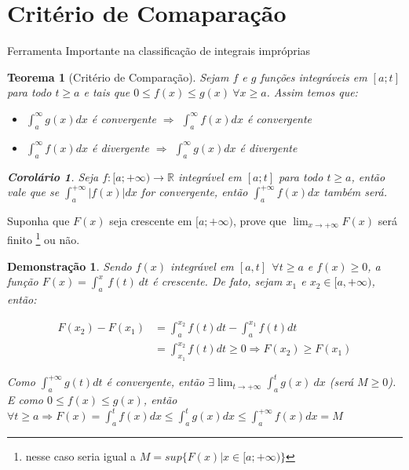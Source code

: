 \documentclass[12pt,openany]{book}
\newtheorem{theorem}{Teorema}[section]
\newtheorem{corollary}{Corolário}[theorem]
\newtheorem{demonstration}{Demonstração}
\begin{document}
\section{Critério de Comaparação}
\label{sec:13}

\hspace{5mm} Ferramenta Importante na classificação de integrais impróprias

\begin{theorem}[Critério de Comparação]
Sejam $f$ e $g$ funções integráveis em $[a;t]$ para todo $t\geq a$ e tais que $0\leq f(x)\leq g(x)\ \forall x \geq a$.  Assim temos que:
\begin{itemize}
\item $\displaystyle{\int_a^{\infty} g(x)dx}$ é convergente $\Rightarrow$ $\displaystyle{\int_a^{\infty} f(x)dx}$ é convergente
\item $\displaystyle{\int_a^{\infty} f(x)dx}$ é divergente $\Rightarrow$ $\displaystyle{\int_a^{\infty} g(x)dx}$ é divergente
\end{itemize}
\vspace{10pt}
\begin{corollary}
Seja $f:[a;+\infty) \rightarrow \mathds{R}$ integrável em $[a;t]$ para todo $t \geq a$, então vale que se $\displaystyle{\int_a^{+\infty}|f(x)| dx}$ for convergente, então $\displaystyle{\int_a^{+\infty} f(x) dx}$ também será.
\end{corollary}
\end{theorem}
\vspace{10pt}

Suponha que $F(x)$ seja crescente em $[a;+\infty)$, prove que $\displaystyle{\lim_{x \rightarrow +\infty} F(x) }$ será finito \footnote{nesse caso seria igual a $M = sup\{F(x)| x \in [a;+\infty)\}$ } ou não.

\begin{demonstration}
Sendo $f(x)$ integrável em $[a,t] \ \ \forall t \geq a$ e $f(x) \geq 0$, a função $\displaystyle{F(x) = \int_a^x\ f(t)\ dt}$ é crescente. De fato, sejam $x_1$ e $x_2 \in [a,+\infty)$, então:

\begin{align*}
F(x_2)-F(x_1) &= \int_a^{x_2} f(t)dt - \int_a^{x_1} f(t)dt \\
&= \int_{x_1}^{x_2} f(t)dt \geq 0 \Rightarrow F(x_2) \geq F(x_1)
\end{align*}

Como $\displaystyle{\int_a^{+\infty} g(t)dt}$ é convergente, então $\displaystyle{\exists \lim_{t \rightarrow +\infty} \int_a^t g(x)\ dx} $ (será $M \geq 0$). E como $0 \leq f(x) \leq g(x)$, então $\forall t \geq a \Rightarrow F(x) = \int_a^t f(x)dx \leq \int_a^t g(x)dx \leq \int_a^{+\infty} f(x)dx = M$
\end{demonstration}
\vspace{10pt}
\end{document}
